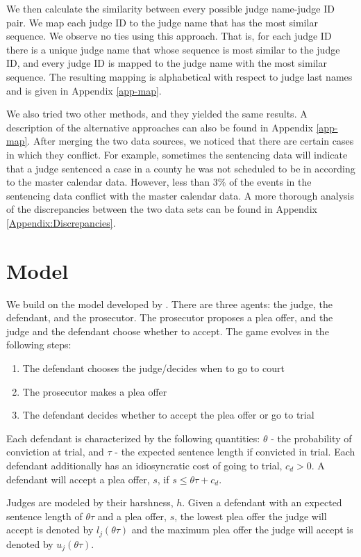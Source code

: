 \documentclass[11pt, oneside]{article}   	%
\theoremstyle{ModifiedStyle}
\begin{document}
		We then calculate the similarity between every possible judge name-judge ID pair. We map each judge ID to the judge name that has the most similar sequence. We observe no ties using this approach. That is, for each judge ID there is a unique judge name that whose sequence is most similar to the judge ID, and every judge ID is mapped to the judge name with the most similar sequence. The resulting mapping is alphabetical with respect to judge last names and is given in Appendix \ref{app-map}.

		We also tried two other methods, and they yielded the same results. A description of the alternative approaches can also be found in Appendix \ref{app-map}. After merging the two data sources, we noticed that there are certain cases in which they conflict. For example, sometimes the sentencing data will indicate that a judge sentenced a case in a county he was not scheduled to be in according to the master calendar data. However, less than $3\%$ of the events in the sentencing data conflict with the master calendar data. A more thorough analysis of the discrepancies between the two data sets can be found in Appendix \ref{Appendix:Discrepancies}.

\section{Model}
  We build on the model developed by \cite{wang2019}. There are three agents: the judge, the defendant, and the prosecutor. The prosecutor proposes a plea offer, and the judge and the defendant choose whether to accept. The game evolves in the following steps:

  \begin{enumerate}
    \item The defendant chooses the judge/decides when to go to court
    \item The prosecutor makes a plea offer
    \item The defendant decides whether to accept the plea offer or go to trial
  \end{enumerate}

  Each defendant is characterized by the following quantities: $\theta$ - the probability of conviction at trial, and $\tau$ - the expected sentence length if convicted in trial. Each defendant additionally has an idiosyncratic cost of going to trial, $c_d >0$. A defendant will accept a plea offer, $s$, if $s \leq \theta \tau + c_d$.

  Judges are modeled by their harshness, $h$. Given a defendant with an expected sentence length of $\theta \tau$ and a plea offer, $s$, the lowest plea offer the judge will accept is denoted by $l_j(\theta \tau)$ and the maximum plea offer the judge will accept is denoted by $u_j(\theta \tau)$.
\end{document}
